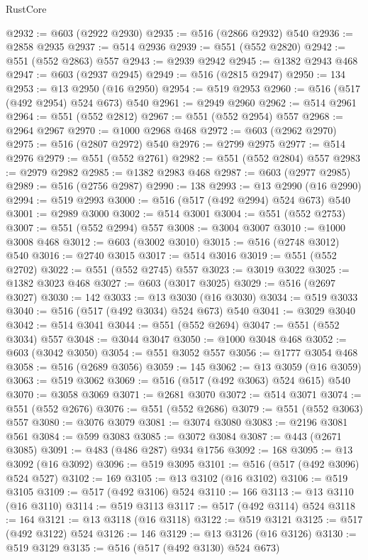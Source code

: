 \begin{lexlean}{RustCore}
\begin{coremodule}
@2932 := @603 (@2922 @2930)
@2935 := @516 (@2866 @2932) @540
@2936 := @2858 @2935
@2937 := @514 @2936
@2939 := @551 (@552 @2820)
@2942 := @551 (@552 @2863) @557
@2943 := @2939 @2942
@2945 := @1382 @2943 @468
@2947 := @603 (@2937 @2945)
@2949 := @516 (@2815 @2947)
@2950 := 134
@2953 := @13 @2950 (@16 @2950)
@2954 := @519 @2953
@2960 := @516 (@517 (@492 @2954) @524 @673) @540
@2961 := @2949 @2960
@2962 := @514 @2961
@2964 := @551 (@552 @2812)
@2967 := @551 (@552 @2954) @557
@2968 := @2964 @2967
@2970 := @1000 @2968 @468
@2972 := @603 (@2962 @2970)
@2975 := @516 (@2807 @2972) @540
@2976 := @2799 @2975
@2977 := @514 @2976
@2979 := @551 (@552 @2761)
@2982 := @551 (@552 @2804) @557
@2983 := @2979 @2982
@2985 := @1382 @2983 @468
@2987 := @603 (@2977 @2985)
@2989 := @516 (@2756 @2987)
@2990 := 138
@2993 := @13 @2990 (@16 @2990)
@2994 := @519 @2993
@3000 := @516 (@517 (@492 @2994) @524 @673) @540
@3001 := @2989 @3000
@3002 := @514 @3001
@3004 := @551 (@552 @2753)
@3007 := @551 (@552 @2994) @557
@3008 := @3004 @3007
@3010 := @1000 @3008 @468
@3012 := @603 (@3002 @3010)
@3015 := @516 (@2748 @3012) @540
@3016 := @2740 @3015
@3017 := @514 @3016
@3019 := @551 (@552 @2702)
@3022 := @551 (@552 @2745) @557
@3023 := @3019 @3022
@3025 := @1382 @3023 @468
@3027 := @603 (@3017 @3025)
@3029 := @516 (@2697 @3027)
@3030 := 142
@3033 := @13 @3030 (@16 @3030)
@3034 := @519 @3033
@3040 := @516 (@517 (@492 @3034) @524 @673) @540
@3041 := @3029 @3040
@3042 := @514 @3041
@3044 := @551 (@552 @2694)
@3047 := @551 (@552 @3034) @557
@3048 := @3044 @3047
@3050 := @1000 @3048 @468
@3052 := @603 (@3042 @3050)
@3054 := @551 @3052 @557
@3056 := @1777 @3054 @468
@3058 := @516 (@2689 @3056)
@3059 := 145
@3062 := @13 @3059 (@16 @3059)
@3063 := @519 @3062
@3069 := @516 (@517 (@492 @3063) @524 @615) @540
@3070 := @3058 @3069
@3071 := @2681 @3070
@3072 := @514 @3071
@3074 := @551 (@552 @2676)
@3076 := @551 (@552 @2686)
@3079 := @551 (@552 @3063) @557
@3080 := @3076 @3079
@3081 := @3074 @3080
@3083 := @2196 @3081 @561
@3084 := @599 @3083
@3085 := @3072 @3084
@3087 := @443 (@2671 @3085)
@3091 := @483 (@486 @287) @934 @1756
@3092 := 168
@3095 := @13 @3092 (@16 @3092)
@3096 := @519 @3095
@3101 := @516 (@517 (@492 @3096) @524 @527)
@3102 := 169
@3105 := @13 @3102 (@16 @3102)
@3106 := @519 @3105
@3109 := @517 (@492 @3106) @524
@3110 := 166
@3113 := @13 @3110 (@16 @3110)
@3114 := @519 @3113
@3117 := @517 (@492 @3114) @524
@3118 := 164
@3121 := @13 @3118 (@16 @3118)
@3122 := @519 @3121
@3125 := @517 (@492 @3122) @524
@3126 := 146
@3129 := @13 @3126 (@16 @3126)
@3130 := @519 @3129
@3135 := @516 (@517 (@492 @3130) @524 @673)

\end{coremodule}
\end{lexlean}
